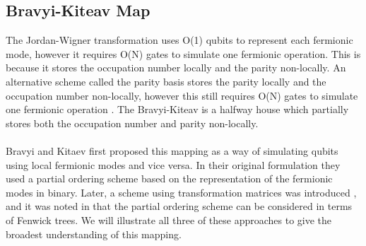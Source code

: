 \documentclass[twoside]{article}
\begin{document}
\subsection{Bravyi-Kiteav Map}\label{bravyi-kitaev_section}
The Jordan-Wigner transformation uses O(1) qubits to represent each fermionic mode, however it requires O(N) gates to simulate one fermionic operation. This is because it stores the occupation number locally and the parity non-locally. An alternative scheme called the parity basis stores the parity locally and the occupation number non-locally, however this still requires O(N) gates to simulate one fermionic operation \cite{seeley}. The Bravyi-Kiteav is a halfway house which partially stores both the occupation number and parity non-locally.
\\\\
Bravyi and Kitaev first proposed this mapping as a way of simulating qubits using local fermionic modes and vice versa. In their original formulation they used a partial ordering scheme based on the representation of the fermionic modes in binary. Later, a scheme using transformation matrices was introduced \cite{seeley}, and it was noted in \cite{operatorLocality} that the partial ordering scheme can be considered in terms of Fenwick trees. We will illustrate all three of these approaches to give the broadest understanding of this mapping. 
\end{document}
